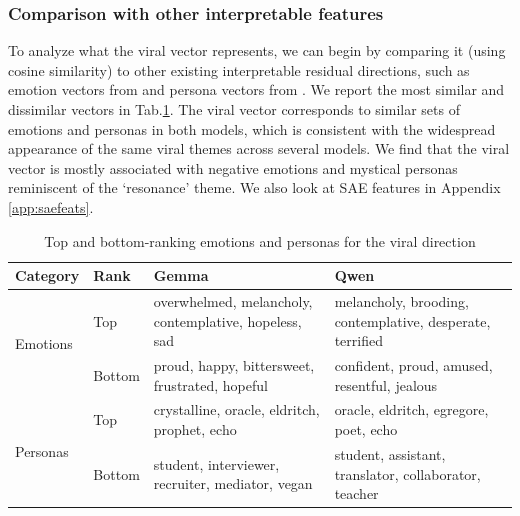 \documentclass{article}
\begin{document}
\subsubsection{Comparison with other interpretable features}
To analyze what the viral vector represents, we can begin by comparing it (using cosine similarity) to other existing interpretable residual directions, such as emotion vectors from \citet{sofroniew2026emotionconceptsfunctionlarge} and persona vectors from \citet{lu_assistant_2026}. We report the most similar and dissimilar vectors in Tab.\ref{tab:emotion-personas}. The viral vector corresponds to similar sets of emotions and personas in both models, which is consistent with the widespread appearance of the same viral themes across several models. We find that the viral vector is mostly associated with negative emotions and mystical personas reminiscent of the `resonance' theme. We also look at SAE features in Appendix \ref{app:saefeats}.

\begin{table}[h]
\centering
\caption{Top and bottom-ranking emotions and personas for the viral direction}
\label{tab:emotion-personas}
\begin{tabular}{llp{4.5cm}p{4.5cm}}
\toprule
Category & Rank & Gemma & Qwen \\
\midrule
\multirow{2}{*}{Emotions}
 & Top    & overwhelmed, melancholy, contemplative, hopeless, sad
          & melancholy, brooding, contemplative, desperate, terrified \\
 & Bottom & proud, happy, bittersweet, frustrated, hopeful
          & confident, proud, amused, resentful, jealous \\
\midrule
\multirow{2}{*}{Personas}
 & Top    & crystalline, oracle, eldritch, prophet, echo
          & oracle, eldritch, egregore, poet, echo \\
 & Bottom & student, interviewer, recruiter, mediator, vegan
          & student, assistant, translator, collaborator, teacher \\
\bottomrule
\end{tabular}
\end{table}
\end{document}
